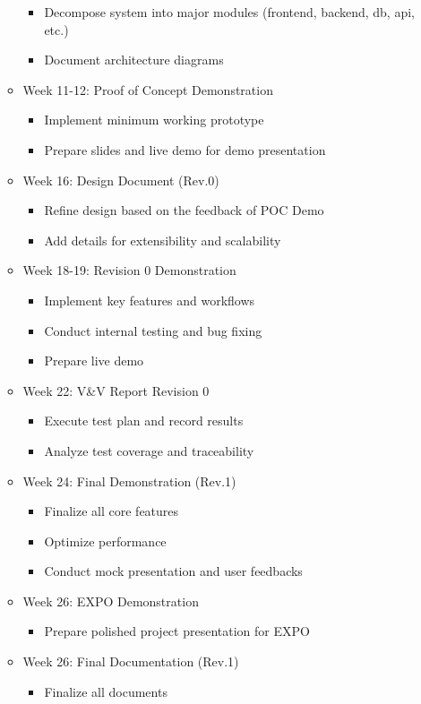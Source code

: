 \documentclass{article}
\begin{document}
\begin{itemize}
\begin{itemize}
			\begin{itemize}
			\item Decompose system into major modules (frontend, backend, db, api, etc.)
			\item Document architecture diagrams
			\end{itemize}
		\item Week 11-12: Proof of Concept Demonstration
			\begin{itemize}
			\item Implement minimum working prototype
			\item Prepare slides and live demo for demo presentation
			\end{itemize}
		\item Week 16: Design Document (Rev.0)
			\begin{itemize}
			\item Refine design based on the feedback of POC Demo
			\item Add details for extensibility and scalability
			\end{itemize}	
		\item Week 18-19: Revision 0  Demonstration
			\begin{itemize}
			\item Implement key features and workflows
			\item Conduct internal testing and bug fixing
			\item Prepare live demo
			\end{itemize}	
		\item Week 22: V\&V Report Revision 0
			\begin{itemize}
			\item Execute test plan and record results
			\item Analyze test coverage and traceability
			\end{itemize}	
		\item Week 24: Final Demonstration (Rev.1)
			\begin{itemize}
			\item Finalize all core features
			\item Optimize performance
			\item Conduct mock presentation and user feedbacks
			\end{itemize}	
		\item Week 26: EXPO Demonstration
			\begin{itemize}
			\item Prepare polished project presentation for EXPO
			\end{itemize}	
		\item Week 26: Final Documentation (Rev.1)
			\begin{itemize}
			\item Finalize all documents
			\end{itemize}	
	\end{itemize}
\end{itemize}
\end{document}
